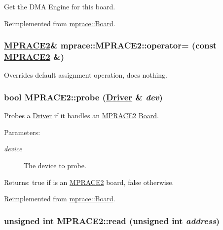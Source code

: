 Get the DMA Engine for this board. 



Reimplemented from \hyperlink{classmprace_1_1Board_a12}{mprace::Board}.\hypertarget{classmprace_1_1MPRACE2_b1}{
\subsubsection[operator=]{\setlength{\rightskip}{0pt plus 5cm}\hyperlink{classmprace_1_1MPRACE2}{MPRACE2}\& mprace::MPRACE2::operator= (const \hyperlink{classmprace_1_1MPRACE2}{MPRACE2} \&)}}
\label{classmprace_1_1MPRACE2_b1}


Overrides default assignment operation, does nothing. 

\hypertarget{classmprace_1_1MPRACE2_e0}{
\subsubsection[probe]{\setlength{\rightskip}{0pt plus 5cm}bool MPRACE2::probe (\hyperlink{classmprace_1_1Driver}{Driver} \& {\em dev})}}
\label{classmprace_1_1MPRACE2_e0}


Probes a \hyperlink{classmprace_1_1Driver}{Driver} if it handles an \hyperlink{classmprace_1_1MPRACE2}{MPRACE2} \hyperlink{classmprace_1_1Board}{Board}. 

\begin{Desc}
\item[Parameters:]
\begin{description}
\item[{\em device}]The device to probe. \end{description}
\end{Desc}
\begin{Desc}
\item[Returns:]true if is an \hyperlink{classmprace_1_1MPRACE2}{MPRACE2} board, false otherwise.\end{Desc}


Reimplemented from \hyperlink{classmprace_1_1Board_e0}{mprace::Board}.\hypertarget{classmprace_1_1MPRACE2_a3}{
\subsubsection[read]{\setlength{\rightskip}{0pt plus 5cm}unsigned int MPRACE2::read (unsigned int {\em address})}}
\label{classmprace_1_1MPRACE2_a3}


